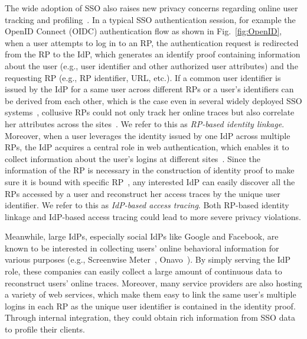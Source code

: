 The wide adoption of SSO also raises new privacy concerns regarding online user tracking and profiling~\cite{maler2008venn,NIST2017draft}. In a typical SSO authentication session, for example the OpenID Connect (OIDC) authentication flow as shown in Fig.~\ref{fig:OpenID}, when a user attempts to log in to an RP, the authentication request is redirected from the RP to the IdP, which generates an identify proof containing information about the user (e.g., user identifier and other authorized user attributes) and the requesting RP (e.g., RP identifier, URL, etc.). If a common user identifier is issued by the IdP for a same user across different RPs or a user's identifiers can be derived from each other, which is the case even in several widely deployed SSO systems~\cite{BrowserID,SPRESSO}, collusive RPs could not only track her online traces but also correlate her attributes across the sites~\cite{maler2008venn}. We refer to this as {\em RP-based identity linkage}. Moreover, when a user leverages the identity issued by one IdP across multiple RPs, the IdP acquires a central role in web authentication, which enables it to collect information about the user's logins at different sites~\cite{maler2008venn}. Since the information of the RP is necessary in the construction of identity proof to make sure it is bound with specific RP~\cite{ChenPCTKT14, WangZLG16}, any interested IdP can easily discover all the RPs accessed by a user and reconstruct her access traces by the unique user identifier. We refer to this as {\em IdP-based access tracing}. Both RP-based identity linkage and IdP-based access tracing could lead to more severe privacy violations.





Meanwhile, large IdPs, especially social IdPs like Google and Facebook, are known to be interested in collecting users' online behavioral information for various purposes (e.g., Screenwise Meter~\cite{googlenews}, Onavo~\cite{Onavo}). By simply serving the IdP role, these companies can easily collect a large amount of continuous data to reconstruct users' online traces. %
Moreover, many service providers are also hosting a variety of web services, which make them easy to link the same user's multiple logins in each RP as the unique user identifier is contained in the identity proof. Through internal integration, they could obtain rich information from SSO data to profile their clients.



